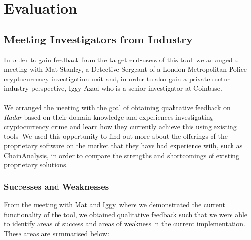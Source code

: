 \chapter{Evaluation}
\section{Meeting Investigators from Industry} 
In order to gain feedback from the target end-users of this tool, we arranged a meeting with Mat Stanley, a Detective Sergeant of a London Metropolitan Police cryptocurrency investigation unit and, in order to also gain a private sector industry perspective, Iggy Azad who is a senior investigator at Coinbase.
\\\\
We arranged the meeting with the goal of obtaining qualitative feedback on \textit{Radar} based on their domain knowledge and experiences investigating cryptocurrency crime and learn how they currently achieve this using existing tools. We used this opportunity to find out more about the offerings of the proprietary software on the market that they have had experience with, such as ChainAnalysis, in order to compare the strengths and shortcomings of existing proprietary solutions.

\subsection{Successes and Weaknesses}
From the meeting with Mat and Iggy, where we demonstrated the current functionality of the tool, we obtained qualitative feedback such that we were able to identify areas of success and areas of weakness in the current implementation. These areas are summarised below:

